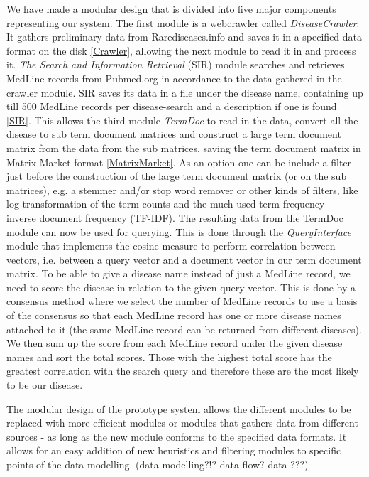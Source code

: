 We have made a modular design that is divided into five major
components representing our system. The first module is a webcrawler
called \textit{DiseaseCrawler}. It gathers preliminary data from
Rarediseases.info and saves it in a specified data format on the disk
\ref{Crawler}, allowing the next module to read it in and process
it. \textit{The Search and Information Retrieval} (SIR) module
searches and retrieves MedLine records from Pubmed.org in accordance
to the data gathered in the crawler module. SIR saves its data in a
file under the disease name, containing up till 500 MedLine records
per disease-search and a description if one is found \ref{SIR}. This
allows the third module \textit{TermDoc} to read in the data, convert
all the disease to sub term document matrices and construct a large
term document matrix from the data from the sub matrices, saving the
term document matrix in Matrix Market format \ref{MatrixMarket}. As an
option one can be include a filter just before the construction of the
large term document matrix (or on the sub matrices), e.g. a stemmer
and/or stop word remover or other kinds of filters, like
log-transformation of the term counts and the much used term frequency
- inverse document frequency (TF-IDF). The resulting data from the
TermDoc module can now be used for querying. This is done through the
\textit{QueryInterface} module that implements the cosine measure to
perform correlation between vectors, i.e. between a query vector and a
document vector in our term document matrix. To be able to give a
disease name instead of just a MedLine record, we need to score the
disease in relation to the given query vector. This is done by a
consensus method where we select the number of MedLine records to use
a basis of the consensus so that each MedLine record has one or more
disease names attached to it (the same MedLine record can be returned
from different diseases). We then sum up the score from each MedLine
record under the given disease names and sort the total scores. Those
with the highest total score has the greatest correlation with the
search query and therefore these are the most likely to be our
disease.

The modular design of the prototype system allows the different
modules to be replaced with more efficient modules or modules that
gathers data from different sources - as long as the new module
conforms to the specified data formats. It allows for an easy addition
of new heuristics and filtering modules to specific points of the data
modelling. (data modelling?!? data flow? data ???)

